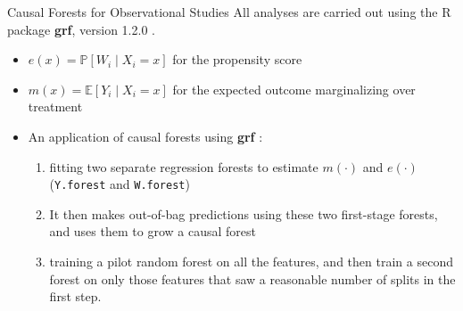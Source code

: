 \documentclass[mathserif, xcolor=table]{beamer}
\begin{document}
\begin{frame}{Causal Forests for Observational Studies}
	All analyses are carried out using the R package \textbf{grf}, version 1.2.0 \citep{tibshirani2018package}.
	\begin{itemize}
		\item $e(x) = \mathbb{P}[W_i\mid X_i = x]$ for the propensity score 
		\item $m(x) = \mathbb{E}[Y_i\mid X_i = x]$ for the expected outcome marginalizing over treatment
		\item An application of causal forests using \textbf{grf} \citep{athey2019estimating}: 
		\begin{enumerate}
			\item fitting two separate regression forests to estimate $m(\cdot)$ and $e(\cdot)$ (\texttt{Y.forest} and \texttt{W.forest})
			\item It then makes out-of-bag predictions using these two first-stage forests, and uses them to grow a causal forest
			\item training a pilot random forest on all the features, and then train a second forest on only those features that saw a reasonable number of splits in the first step.
		\end{enumerate}
	\end{itemize}
\end{frame}
\end{document}
